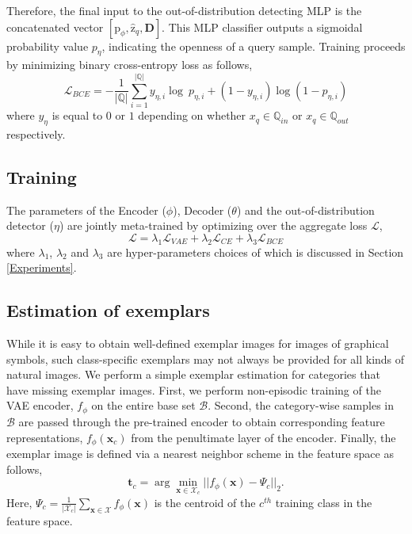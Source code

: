 Therefore, the final input to the out-of-distribution detecting MLP is the concatenated vector $[\boldsymbol{\mathrm{p}}_{\phi}, \boldsymbol{\hat{\mathrm{z}}}_q, \mathbf{D}]$. This MLP classifier outputs a sigmoidal probability value $p_{\eta}$, indicating the openness of a query sample. Training proceeds by minimizing binary cross-entropy loss as follows,
 \begin{equation}
     \mathcal{L}_{BCE} = -\frac{1}{|\mathbb{Q}|}\sum\limits_{i=1}^{|\mathbb{Q}|}y_{\eta,i}\log \ p_{\eta,i}+(1-y_{\eta,i})\log (1-p_{\eta,i})
     \label{eq:bce}
 \end{equation}
where $y_{\eta}$ is equal to $0$ or $1$ depending on whether $x_q \in \mathbb{Q}_{in}$ or $x_q \in \mathbb{Q}_{out}$ respectively. 

\subsection{Training} \label{sec:training}
The parameters of the Encoder ($\phi$), Decoder ($\theta$) and the out-of-distribution detector ($\eta$) are jointly meta-trained by optimizing over the aggregate loss $\mathcal{L}$,
\vspace{1pt}
\begin{equation}\label{loss_func}
    \mathcal{L} = \lambda_1\mathcal{L}_{VAE}+\lambda_2\mathcal{L}_{CE}+\lambda_3\mathcal{L}_{BCE}
\end{equation}
where $\lambda_1$, $\lambda_2$ and $\lambda_3$ are hyper-parameters choices of which is discussed in Section \ref{Experiments}.

\subsection{Estimation of exemplars}
While it is easy to obtain well-defined exemplar images for images of graphical symbols, such class-specific exemplars may not always be provided for all kinds of natural images. We perform a simple exemplar estimation for categories that have missing exemplar images. First, we perform non-episodic training of the VAE encoder, $f_{\phi}$ on the entire base set $\mathcal{B}$. Second, the category-wise samples in $\mathcal{B}$ are passed through the pre-trained encoder to obtain corresponding feature representations, $f_{\phi}(\mathbf{x}_c)$ from the penultimate layer of the encoder. Finally, the exemplar image is defined via a nearest neighbor scheme in the feature space as follows,
\begin{equation}
    \mathbf{t}_{c} = \arg\min_{\mathbf{x} \in \mathcal{X}_c} ||f_{\phi}(\mathbf{x}) - \Psi_{c}||_2.
\end{equation}
Here, $\Psi_c = \frac{1}{|\mathcal{X}_c|}\sum\limits_{\mathbf{x} \in \mathcal{X}}{f_{\phi}(\mathbf{x})}$ is the centroid of the $c^{th}$ training class in the feature space.

